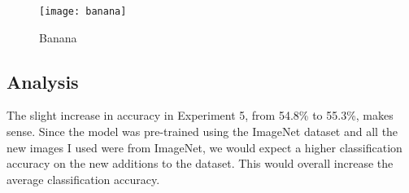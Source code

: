 \begin{figure}
    \texttt{[image: banana]}
    \caption{Banana}
    \label{fig:banana}
\end{figure}

\subsection*{Analysis}
The slight increase in accuracy in Experiment 5, from 54.8\% to 55.3\%, makes
sense. Since the model was pre-trained using the ImageNet dataset and all the
new images I used were from ImageNet, we would expect a higher classification
accuracy on the new additions to the dataset. This would overall increase the
average classification accuracy.

